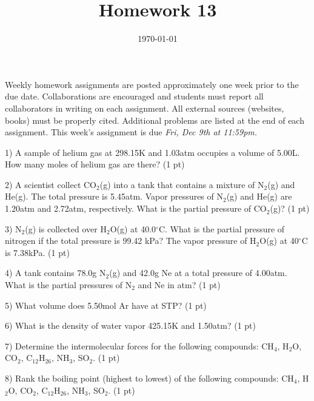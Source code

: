 \documentclass[12pt]{article}
\title{\textbf{Homework 13}}
\date{\vspace{-2em}\today}
\begin{document}
\maketitle 

Weekly homework assignments are posted approximately one week prior to the
due date. Collaborations are encouraged and students must report all collaborators
in writing on each assignment. All external sources (websites, books) must be
properly cited. Additional problems are listed at the end of each assignment.
This week's assignment is due \textit{Fri, Dec 9th at 11:59pm.}

1) A sample of helium gas at 298.15K and 1.03atm occupies a volume of 5.00L. How
many moles of helium gas are there? (1 pt)

\vspace{1.5in}

2) A scientist collect CO$_2$(g) into a tank that contains a mixture of N$_2$(g) and
He(g). The total pressure is 5.45atm. Vapor pressures of N$_2$(g) and He(g) are 1.20atm
and 2.72atm, respectively. What is the partial pressure of CO$_2$(g)? (1 pt)

\vspace{1.5in}

3) N$_2$(g) is collected over H$_2$O(g) at 40.0$^\circ$C. What is the partial pressure of nitrogen
if the total pressure is 99.42 kPa? The vapor pressure of H$_2$O(g) at 40$^\circ$C is 7.38kPa.
(1 pt)

\vspace{1.5in}

4) A tank contains 78.0g N$_2$(g) and 42.0g Ne at a total pressure of 4.00atm. What
is the partial pressures of N$_2$ and Ne in atm? (1 pt)

\vspace{1.5in}

5) What volume does 5.50mol Ar have at STP? (1 pt)

\vspace{1.5in}

6) What is the density of water vapor 425.15K and 1.50atm? (1 pt)

\vspace{1.5in}

7) Determine the intermolecular forces for the following compounds: CH$_4$, H$_2$O,
CO$_2$, C$_{12}$H$_{26}$, NH$_3$, SO$_2$. (1 pt)

\vspace{1.5in}

8) Rank the boiling point (highest to lowest) of the following compounds: CH$_4$, H$_2$O,
CO$_2$, C$_{12}$H$_{26}$, NH$_3$, SO$_2$. (1 pt)
\end{document}
